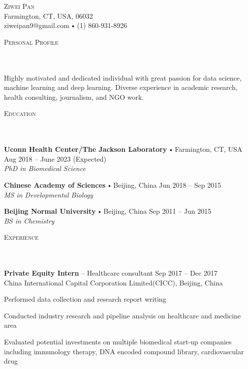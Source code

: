\documentclass{article}
\newcommand{\contact}[3]{
\vspace*{5pt}
\begin{center}
{\LARGE \scshape {#1}}\\
\vspace{3pt}
#2 
\vspace{2pt}
#3
\end{center}
\vspace*{-8pt}
}
\newcommand{\header}[1]{{
\hspace*{-15pt}\vspace*{6pt} \textsc{#1}} \vspace*{-6pt} 
\lineunder
}
\newcommand{\lineunder}{
\vspace*{-8pt} \\ \hspace*{-18pt} 
\hrulefill \\
}
\newcommand{\content}{
\vspace*{2pt}%
}
\newcommand{\school}[4]{
\textbf{#1} \labelitemi #2 \hfill #3 \\ #4 \vspace*{5pt}
}
\newcommand{\employer}[4]{{
\vspace*{2pt}%
\textbf{#1} #2 \hfill #3\\ #4 \vspace*{2pt}}
}
\renewcommand{\labelitemi}{
$\vcenter{\hbox{\tiny$\bullet$}}$\hspace*{3pt}
}
\renewcommand{\labelitemii}{
$\vcenter{\hbox{\tiny$\bullet$}}$\hspace*{-3pt}
}
\newenvironment{bullet-list-minor}{
\begin{list}{\labelitemii}{\setlength\leftmargin{15pt} 
\topsep 0pt \itemsep -2pt}}{\vspace*{4pt}\end{list}
}
\begin{document}
\small
\smallskip
\vspace*{-44pt}

\contact{Ziwei Pan}
{Farmington, CT, USA, 06032\\}
{ziweipan9@gmail.com \labelitemi (1) 860-931-8926}
\vspace{15pt}
\header{Personal Profile}
\content{Highly motivated and dedicated individual with great passion for data science, machine learning and deep learning. Diverse experience in academic research, health consulting, journalism, and NGO work.\vspace{5pt}}



\vspace*{4pt}%
\header{Education}
    \school{Uconn Health Center/The Jackson Laboratory}{Farmington, CT, USA}{Aug 2018 -- June 2023 (Expected)}
    {\textit{PhD in Biomedical Science}}

    \school{Chinese Academy of Sciences}{Beijing, China}{Jun 2018 -- Sep 2015}
    {\textit{MS in Developmental Biology}}
    
    \school{Beijing Normal University}{Beijing, China}{Sep 2011 -- Jun 2015}
    {\textit{BS in Chemistry}}
    
\vspace*{4pt}%
\header{Experience}
    \employer{Private Equity Intern}{-- Healthcare consultant}{Sep 2017 -- Dec 2017}{China International Capital Corporation Limited(CICC), Beijing, China}
	\begin{bullet-list-minor}
	\item Performed data collection and research report writing
	\item Conducted industry research and pipeline analysis on healthcare and medicine area
	\item Evaluated potential investments on multiple biomedical start-up companies including immunology therapy, DNA encoded compound library, cardiovascular drug
    \end{bullet-list-minor}
    
\end{document}

